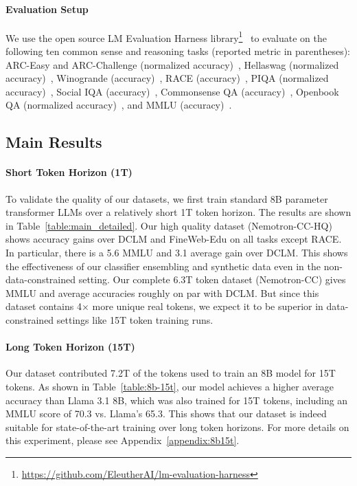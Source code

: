 \documentclass[11pt]{article}
\newcommand{\DCLM}{\textsc{DCLM}\xspace}
\newcommand{\Ours}{Nemotron-CC\xspace}
\begin{document}
\paragraph{Evaluation Setup} We use the open source LM Evaluation Harness library\footnote{\url{https://github.com/EleutherAI/lm-evaluation-harness}}~\citep{eval-harness} to evaluate on the following ten common sense and reasoning tasks (reported metric in parentheses): ARC-Easy and ARC-Challenge (normalized accuracy)~\citep{clark2018think}, Hellaswag (normalized accuracy)~\citep{zellers2019hellaswag}, Winogrande (accuracy)~\citep{sakaguchi2021winogrande}, RACE (accuracy)~\citep{lai2017race}, PIQA (normalized accuracy)~\citep{bisk2020piqa}, Social IQA (accuracy)~\citep{sap2019social}, Commonsense QA (accuracy)~\citep{talmor2019commonsenseqa}, Openbook QA (normalized accuracy)~\citep{mihaylov2018can}, and MMLU (accuracy)~\citep{hendrycks2021measuring}.

\subsection{Main Results}



\paragraph{Short Token Horizon (1T)}

To validate the quality of our datasets, we first train standard 8B parameter transformer LLMs over a relatively short 1T token horizon. The results are shown in Table~\ref{table:main_detailed}. Our high quality dataset (\Ours-HQ) shows accuracy gains over \DCLM and FineWeb-Edu on all tasks except RACE. In particular, there is a 5.6 MMLU and 3.1 average gain over \DCLM. This shows the effectiveness of our classifier ensembling and synthetic data even in the non-data-constrained setting. Our complete 6.3T token dataset (\Ours) gives MMLU and average accuracies roughly on par with \DCLM. But since this dataset contains 4$\times$ more unique real tokens, we expect it to be superior in data-constrained settings like 15T token training runs.

\paragraph{Long Token Horizon (15T)}

Our dataset contributed 7.2T of the tokens used to train an 8B model for 15T tokens.
As shown in Table~\ref{table:8b-15t}, our model achieves a higher average accuracy than Llama 3.1 8B, which was also trained for 15T tokens, including an MMLU score of 70.3 vs. Llama's 65.3. This shows that our dataset is indeed suitable for state-of-the-art training over long token horizons. For more details on this experiment, please see Appendix~\ref{appendix:8b15t}.
\end{document}
